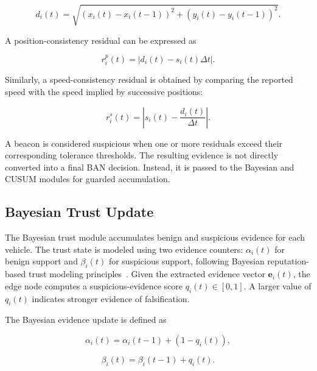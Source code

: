 \documentclass[journal]{IEEEtran}
\begin{document}
\begin{equation}
d_i(t)=\sqrt{(x_i(t)-x_i(t-1))^2+(y_i(t)-y_i(t-1))^2}.
\label{eq:observed_displacement}
\end{equation}

A position-consistency residual can be expressed as

\begin{equation}
r_i^{p}(t)=\left|d_i(t)-s_i(t)\Delta t\right|.
\label{eq:position_residual}
\end{equation}

Similarly, a speed-consistency residual is obtained by comparing the reported speed with the speed implied by successive positions:

\begin{equation}
r_i^{s}(t)=\left|s_i(t)-\frac{d_i(t)}{\Delta t}\right|.
\label{eq:speed_residual}
\end{equation}

A beacon is considered suspicious when one or more residuals exceed their corresponding tolerance thresholds. The resulting evidence is not directly converted into a final BAN decision. Instead, it is passed to the Bayesian and CUSUM modules for guarded accumulation.

\subsection{Bayesian Trust Update}
\label{subsec:bayesian_update}

The Bayesian trust module accumulates benign and suspicious evidence for each
vehicle. The trust state is modeled using two evidence counters:
\(\alpha_i(t)\) for benign support and \(\beta_i(t)\) for suspicious support,
following Bayesian reputation-based trust modeling
principles~\cite{josang2002}. Given the extracted evidence vector
\(\mathbf{e}_i(t)\), the edge node computes a suspicious-evidence score
\(q_i(t)\in[0,1]\). A larger value of \(q_i(t)\) indicates stronger evidence
of falsification.

The Bayesian evidence update is defined as

\begin{equation}
\alpha_i(t)=\alpha_i(t-1)+\left(1-q_i(t)\right),
\label{eq:alpha_update}
\end{equation}

\begin{equation}
\beta_i(t)=\beta_i(t-1)+q_i(t).
\label{eq:beta_update}
\end{equation}
\end{document}
